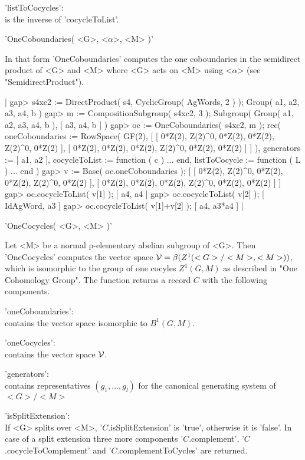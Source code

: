 'listToCocycles': \\
        is the inverse of 'cocycleToList'.

'OneCoboundaries( <G>, <$\alpha$>, <M> )'

In that  form   'OneCoboundaries' computes the   one coboundaries in  the
semidirect product of <G> and <M> where <G> acts  on <M> using <$\alpha$>
(see "SemidirectProduct").

|    gap> s4xc2 := DirectProduct( s4, CyclicGroup( AgWords, 2 ) );
    Group( a1, a2, a3, a4, b )
    gap> m := CompositionSubgroup( s4xc2, 3 );
    Subgroup( Group( a1, a2, a3, a4, b ), [ a3, a4, b ] )
    gap> oc := OneCoboundaries( s4xc2, m );
    rec(
      oneCoboundaries := RowSpace( GF(2),
        [ [ 0*Z(2), Z(2)^0, 0*Z(2), 0*Z(2), Z(2)^0, 0*Z(2) ],
          [ 0*Z(2), 0*Z(2), 0*Z(2), Z(2)^0, 0*Z(2), 0*Z(2) ] ] ),
      generators := [ a1, a2 ],
      cocycleToList := function ( c ) ... end,
      listToCocycle := function ( L ) ... end )
    gap> v := Base( oc.oneCoboundaries );
    [ [ 0*Z(2), Z(2)^0, 0*Z(2), 0*Z(2), Z(2)^0, 0*Z(2) ],
      [ 0*Z(2), 0*Z(2), 0*Z(2), Z(2)^0, 0*Z(2), 0*Z(2) ] ]
    gap> oc.cocycleToList( v[1] );
    [ a4, a4 ]
    gap> oc.cocycleToList( v[2] );
    [ IdAgWord, a3 ]
    gap> oc.cocycleToList( v[1]+v[2] );
    [ a4, a3*a4 ] |


'OneCocycles( <G>, <M> )'

Let  <M>  be   a normal   p-elementary  abelian  subgroup  of  <G>.  Then
'OneCocycles' computes the vector space ${\cal V} =  \beta( Z^1( <G>/<M>,
<M> ) )$, which is isomorphic to the group of  one cocyles $Z^1( G,  M )$
as  described in "One Cohomology  Group".   The function returns a record
$C$ with the following components.

'oneCoboundaries': \\
        contains the vector space isomorphic to $B^1( G, M )$.

'oneCocycles': \\
        contains the vector space ${\cal V}$.

'generators': \\
        contains    representatives    $(g_1,   ...,   g_l)$    for   the
        canonical generating system of $<G> / <M>$

'isSplitExtension':  \\
        If <G>   splits over   <M>,   '$C$.isSplitExtension'  is  'true',
        otherwise it is   'false'.  In    case   of a   split   extension
        three           more      components            '$C$.complement',
        '$C$.cocycleToComplement'      and       '$C$.complementToCycles'
        are returned.

